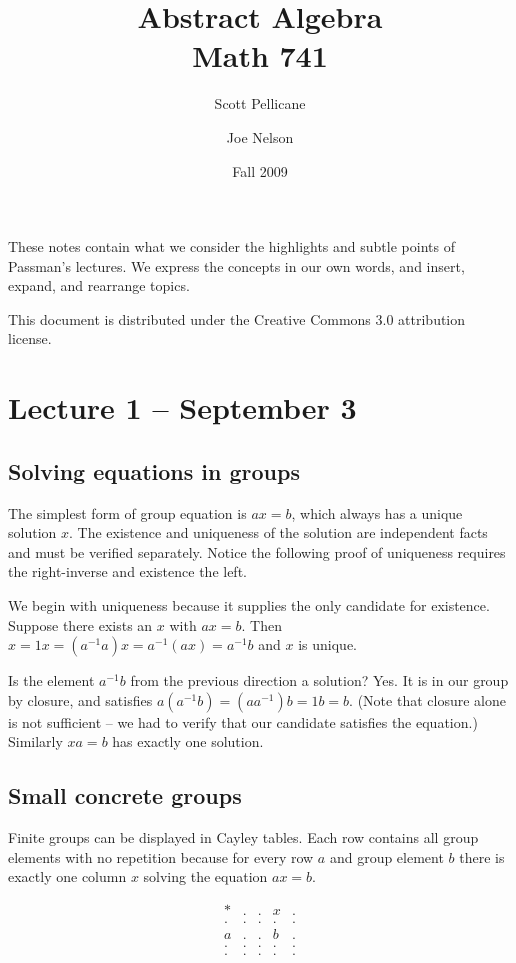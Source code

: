 \documentclass[letterpaper]{article}
\begin{document}
\title{Abstract Algebra\\
Math 741}
\author{Scott Pellicane \and Joe Nelson}
\date{Fall 2009}
\maketitle

These notes contain what we consider the highlights and subtle points of Passman's lectures. We express the concepts in our own words, and insert, expand, and rearrange topics.

This document is distributed under the Creative Commons 3.0 attribution license.

\section{Lecture 1 -- September 3}

\subsection{Solving equations in groups}

The simplest form of group equation is $ax = b$, which always has a unique solution $x$. The existence and uniqueness of the solution are independent facts and must be verified separately. Notice the following proof of uniqueness requires the right-inverse and existence the left.

We begin with uniqueness because it supplies the only candidate for existence.  Suppose there exists an $x$ with $ax = b$. Then $x = 1x = (a^{-1}a)x = a^{-1}(ax) = a^{-1}b$ and $x$ is unique.

Is the element $a^{-1}b$ from the previous direction a solution? Yes. It is in our group by closure, and satisfies $a(a^{-1}b) = (aa^{-1})b = 1b = b$.  (Note that closure alone is not sufficient -- we had to verify that our candidate satisfies the equation.) Similarly $xa = b$ has exactly one solution.

\subsection{Small concrete groups}

Finite groups can be displayed in Cayley tables. Each row contains all group elements with no repetition because for every row $a$ and group element $b$ there is exactly one column $x$ solving the equation $ax = b$.

\[
\begin{array}{r|*{5}{r}}
* & . & . & x & . \\
\hline
. & . & . & . & . \\
a & . & . & b & . \\
. & . & . & . & . \\
. & . & . & . & . \\
\end{array}
\]
\end{document}
